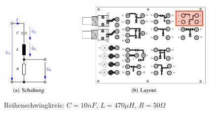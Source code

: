 \begin{figure}[H]
\centering
\includegraphics[scale=1]{Oszi/Bilder/resonanz}
\caption{Reihenschwingkreis: $C=10nF$, $L=470\mu H$, $R=50\Omega$}
\label{resonanz}
\end{figure}



